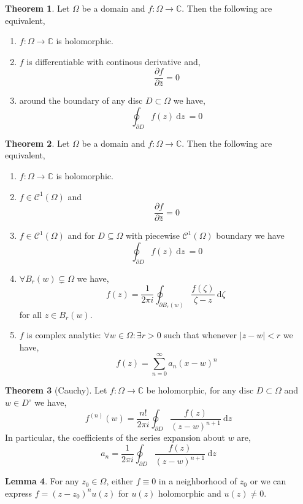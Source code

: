 \documentclass{article}
\newcommand{\C}{\mathbb{C}}
\renewcommand{\d}[1]{\: \mathrm{d}#1 \:}
\newcommand{\pderiv}[2]{\frac{\partial{#1}}{\partial{#2}}}
\theoremstyle{definition}
\newtheorem{theorem}{Theorem}[section]
\newtheorem{lemma}[theorem]{Lemma}
\newcommand{\Class}[2]{\mathcal{C}^{#1} \left( #2 \right)}
\begin{document}
\begin{theorem}
Let $\Omega$ be a domain and $f : \Omega \to \C$. Then the following are equivalent,
\begin{enumerate}
\item $f : \Omega \to \C$ is holomorphic.
\item $f$ is differentiable with continous derivative and,
\[ \pderiv{f}{\bar{z}} = 0 \]
\item around the boundary of any disc $D \subset \Omega$ we have,
\[ \oint_{\partial D} f(z) \d{z} = 0 \]
\end{enumerate}
\end{theorem}

\begin{theorem}
Let $\Omega$ be a domain and $f : \Omega \to \C$. Then the following are equivalent,
\begin{enumerate}
\item $f : \Omega \to \C$ is holomorphic.
\item $f \in \Class{1}{\Omega}$ and 
\[ \pderiv{f}{\bar{z}} = 0 \]
\item $f \in \Class{1}{\Omega}$ and for $D \subseteq \Omega$ with piecewise $\Class{1}{\Omega}$ boundary we have \[ \oint_{\partial D} f(z) \d{z} = 0 \]
\item $\forall B_{r}(w) \subsetneq \Omega$ we have,
\[ f(z) = \frac{1}{2 \pi i} \oint_{\partial B_{r}(w)} \frac{f(\zeta)}{\zeta - z} \d{\zeta} \] 
for all $z \in B_r(w)$. 
\item $f$ is complex analytic: $\forall w  \in \Omega : \exists r > 0$ such that whenever $|z - w| < r$ we have,
\[ f(z) = \sum_{n = 0}^\infty a_n(x - w)^n \]
\end{enumerate}
\end{theorem}

\begin{theorem}[Cauchy]
Let $f : \Omega \to \C$ be holomorphic, for any disc $D \subset \Omega$ and $w \in D^\circ$ we have,
\[ f^{(n)}(w) = \frac{n !}{2 \pi i} \oint_{\partial D} \frac{f(z)}{(z - w)^{n+1}} \d{z} \]
In particular, the coefficients of the series expansion about $w$ are,
\[ a_n = \frac{1}{2 \pi i} \oint_{\partial D} \frac{f(z)}{(z - w)^{n+1}} \d{z} \]
\end{theorem}


\begin{lemma}
For any $z_0 \in \Omega$, either $f \equiv 0$ in a neighborhood of $z_0$ or we can express $f = (z - z_0)^n u(z)$ for $u(z)$ holomorphic and $u(z) \neq 0$.
\end{lemma}
\end{document}
